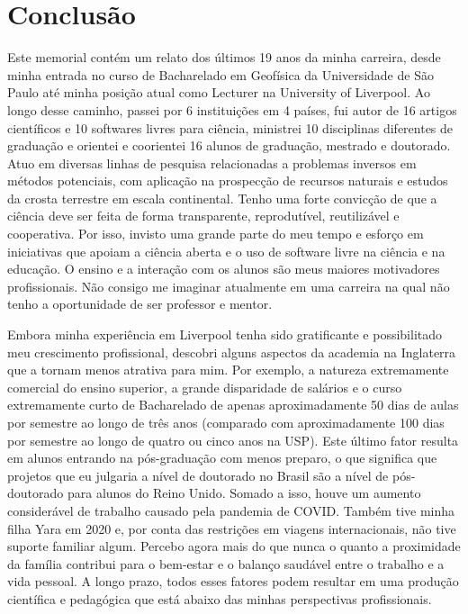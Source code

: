 \documentclass[10pt,a4paper,oneside]{book}
\begin{document}
\chapter{Conclusão}
\label{cap_conclusao}

Este memorial contém um relato dos últimos 19 anos da minha carreira, desde
minha entrada no curso de Bacharelado em Geofísica da Universidade de São Paulo
até minha posição atual como Lecturer na University of Liverpool.
Ao longo desse caminho, passei por 6 instituições em 4 países, fui autor de 16
artigos científicos e 10 softwares livres para ciência, ministrei 10
disciplinas diferentes de graduação e orientei e coorientei 16 alunos de
graduação, mestrado e doutorado.
Atuo em diversas linhas de pesquisa relacionadas a problemas inversos em
métodos potenciais, com aplicação na prospecção de recursos naturais e estudos
da crosta terrestre em escala continental.
Tenho uma forte convicção de que a ciência deve ser feita de forma
transparente, reprodutível, reutilizável e cooperativa.
Por isso, invisto uma grande parte do meu tempo e esforço em iniciativas que
apoiam a ciência aberta e o uso de software livre na ciência e na educação.
O ensino e a interação com os alunos são meus maiores motivadores
profissionais.
Não consigo me imaginar atualmente em uma carreira na qual não tenho a
oportunidade de ser professor e mentor.

Embora minha experiência em Liverpool tenha sido gratificante e possibilitado
meu crescimento profissional, descobri alguns aspectos da academia na
Inglaterra que a tornam menos atrativa para mim.
Por exemplo, a natureza extremamente comercial do ensino superior, a grande
disparidade de salários e o curso extremamente curto de Bacharelado de apenas
aproximadamente 50 dias de aulas por semestre ao longo de três anos (comparado
com aproximadamente 100 dias por semestre ao longo de quatro ou cinco anos na
USP).
Este último fator resulta em alunos entrando na pós-graduação com menos
preparo, o que significa que projetos que eu julgaria a nível de doutorado no
Brasil são a nível de pós-doutorado para alunos do Reino Unido.
Somado a isso, houve um aumento considerável de trabalho causado pela pandemia
de COVID.
Também tive minha filha Yara em 2020 e, por conta das restrições em viagens
internacionais, não tive suporte familiar algum.
Percebo agora mais do que nunca o quanto a proximidade da família contribui
para o bem-estar e o balanço saudável entre o trabalho e a vida pessoal.
A longo prazo, todos esses fatores podem resultar em uma produção científica e
pedagógica que está abaixo das minhas perspectivas profissionais.
\end{document}
